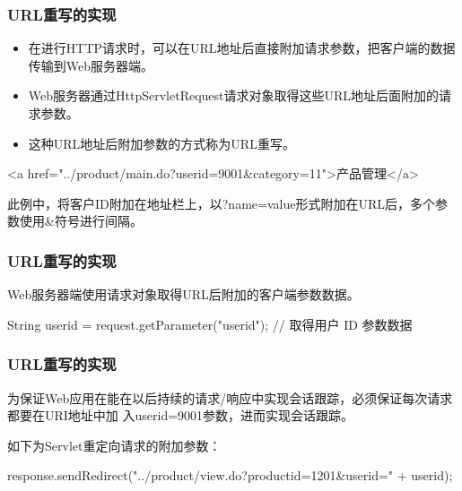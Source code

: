 \begin{frame}[fragile] %
  \frametitle{URL重写的实现}

  
  \begin{itemize}
  \item 在进行HTTP请求时，可以在URL地址后直接附加请求参数，把客户端的数据传输到Web服务器端。
  \item Web服务器通过HttpServletRequest请求对象取得这些URL地址后面附加的请求参数。
  \item 这种URL地址后附加参数的方式称为{\hei URL重写}。
  \end{itemize}


  \begin{xmlCode}
    <a href="../product/main.do?userid=9001&category=11">产品管理</a>
  \end{xmlCode}

  {\kai\Blue 此例中，将客户ID附加在地址栏上，以?name=value形式附加在URL后，多个参数使用\&符号进行间隔。}
\end{frame}

\begin{frame}[fragile] %
  \frametitle{URL重写的实现} 

  
  Web服务器端使用请求对象取得URL后附加的客户端参数数据。
  
  \begin{javaCode}
    String userid = request.getParameter("userid"); // 取得用户 ID 参数数据
  \end{javaCode}

\end{frame}

\begin{frame}[fragile] %
  \frametitle{URL重写的实现}

  
  为保证Web应用在能在以后持续的请求/响应中实现会话跟踪，必须保证每次请求都要在URI地址中加
  入userid=9001参数，进而实现会话跟踪。

  如下为Servlet重定向请求的附加参数：
  
  \begin{javaCode}
    response.sendRedirect("../product/view.do?productid=1201&userid=" + userid);
  \end{javaCode}
\end{frame}

